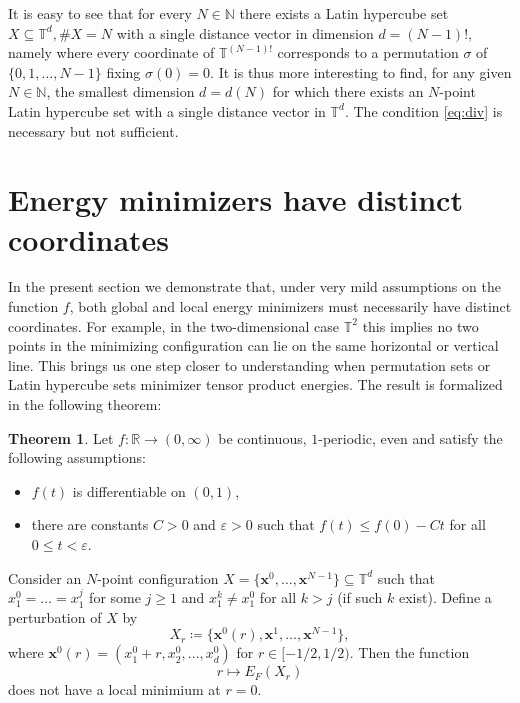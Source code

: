 \documentclass[a4paper,12pt]{article}
\numberwithin{equation}{section}
\theoremstyle{definition}
\newtheorem{thm}{Theorem}[section]
\newcommand{\bx}{\mathbf{x}}
\newcommand{\bbN}{\mathbb{N}}
\newcommand{\bbT}{\mathbb{T}}
\newcommand{\sbse}{\subseteq}
\begin{document}
It is easy to see that for every $N \in \bbN$ there exists a Latin hypercube set  $X \sbse \bbT^d, \#X = N$ with a single distance vector in dimension $d = (N-1)!$, namely where every coordinate of $\bbT^{(N-1)!}$ corresponds to a permutation $\sigma$ of $\{0, 1,\dots, N-1\}$ fixing $\sigma(0) = 0$. It is thus more interesting to find, for any given $N \in \bbN$, the smallest dimension $d = d(N)$ for which there exists an $N$-point Latin hypercube set with a single distance vector in $\bbT^d$. The condition \eqref{eq:div} is necessary but not sufficient.

\section{Energy minimizers have distinct coordinates}\label{s.noequal}

In the present section we  demonstrate that, under very mild assumptions on the function $f$, both global and local energy minimizers must necessarily have distinct coordinates. For example, in the two-dimensional case $\bbT^2$ this implies no two points in  the minimizing configuration can lie on the same horizontal or vertical line. This brings us one step closer to understanding when permutation sets or Latin hypercube sets minimizer tensor product energies. The result is formalized in the following theorem:


\begin{thm}\label{prop:coordinate_improvement}
	Let $f: \mathbb R  \rightarrow (0, \infty)$ be continuous, $1$-periodic, even and satisfy the following assumptions:
	\begin{itemize}		
		\item [(i)] $f(t)$ is differentiable on $(0, 1)$, %
		
		\item [(ii)] there are constants $C > 0$ and  $\varepsilon > 0$ such that  $f(t) \leq f(0) - Ct$ for all $0 \leq t < \varepsilon$. %
	\end{itemize}
	Consider an $N$-point configuration  $X = \{\bx^0, \dots, \bx^{N-1}\} \subseteq \bbT^d$ such that $x^0_1 = \dots = x^j_1$ for some  $j \geq 1$ and $x^k_1 \neq x^0_1$ for all $k > j$ (if such $k$ exist). %
	Define a perturbation of $X$ by
    $$
	X_r \coloneqq \{\bx^0(r), \bx^1, \dots, \bx^{N-1}\},
	$$
    where $\bx^0(r) = (x_1^0 + r, x_2^0, \dots, x_d^0)$ for $r \in [-1/2, 1/2)$. Then the function
    $$
    r \mapsto E_F(X_{r})
    $$
    does not have a local minimium at $r=0$.
	\end{thm}
\end{document}

